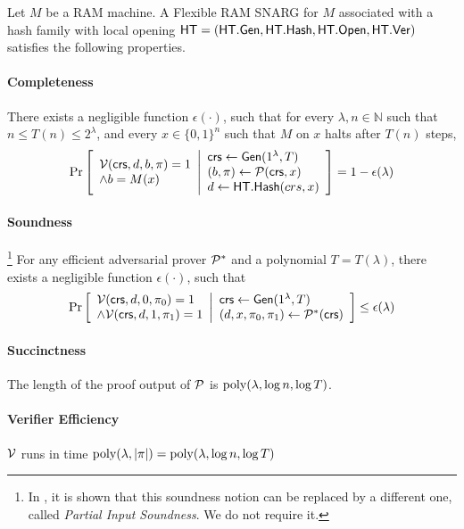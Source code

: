 \begin{definition}
Let $M$ be a RAM machine. A Flexible RAM SNARG for $M$ associated with a hash family with local opening
$\mathsf{HT} = (\mathsf{HT}.\mathsf{Gen}, \mathsf{HT}.\mathsf{Hash}, \mathsf{HT}.\mathsf{Open}, \mathsf{HT}.\mathsf{Ver})$ satisfies the following properties.
\paragraph{Completeness} 
There exists a negligible function $\epsilon(\cdot)$, such that for every $\lambda, n\in \mathbb{N}$ such that $n\leq T(n) \leq 2^\lambda$, and every $x\in \{0,1\}^n$ such that $M$ on $x$ halts after $T(n)$ steps,
\begin{gather*}
    \underset{}{\text{Pr}}\left [
    \begin{array}{ll}
    \mathcal{V}(\mathsf{crs}, d, b, \pi) = 1 \\
    \wedge b = M(x)
    \end{array}
    \middle\vert
    \begin{array}{ll}
    \mathit{ \mathsf{crs} } \leftarrow \mathsf{Gen}(1^\lambda, T) \\
    (b, \pi) \leftarrow \mathcal{P}(\mathsf{crs}, x) \\
    d \leftarrow \mathsf{HT}.\mathsf{Hash}(crs, x)
    \end{array}
    \right ] = 1 - \epsilon(\lambda)
\end{gather*}

\paragraph{Soundness}\footnote{
In \cite{cryptoeprint:2022/1320}, it is shown that this soundness notion can be replaced by a different one, called \emph{Partial Input Soundness}. We do not require it.
}
For any efficient adversarial prover $\mathcal{P}^*$ and a polynomial $T = T(\lambda)$, there exists a negligible function $\epsilon(\cdot)$, such that
\begin{gather*}
    \underset{}{\text{Pr}}\left [
    \begin{array}{ll}
    \mathcal{V}(\mathit{ \mathsf{crs} }, d, 0, \pi_0) = 1 \\
    \wedge \mathcal{V}(\mathsf{crs}, d, 1, \pi_1) = 1
    \end{array}
    \middle\vert
    \begin{array}{ll}
    \mathit{ \mathsf{crs} } \leftarrow \mathsf{Gen}(1^\lambda, T) \\
    (d, x, \pi_0, \pi_1) \leftarrow \mathcal{P}^*(\mathit{ \mathsf{crs} }) \\
    \end{array}
    \right ] \leq \epsilon(\lambda)
\end{gather*}
\paragraph{Succinctness} The length of the proof output of $\mathcal{P}$ is $\operatorname{poly}(\lambda, \log n,\log T)$.
\paragraph{Verifier Efficiency} $\mathcal{V}$ runs in time $\operatorname{poly}(\lambda, |\pi|) = \operatorname{poly}(\lambda, \log n, \log T)$    
\end{definition}

